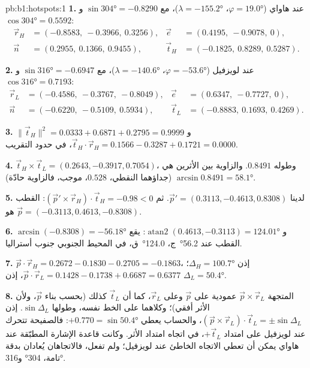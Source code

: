 \begin{solution}{pb:b1:hotspots:1}
\textbf{1.} عند هاواي ($\varphi = \ang{19.0}$، $\lambda = \ang{-155.2}$)، مع $\sin\ang{304} = -0.8290$ و$\cos\ang{304} = 0.5592$:
\[
\begin{aligned}
  \vec r_H &= (-0.8583,\ -0.3966,\ 0.3256), &
  \vec e &= (0.4195,\ -0.9078,\ 0),\\
  \vec n &= (0.2955,\ 0.1366,\ 0.9455), &
  \vec t_H &= (-0.1825,\ 0.8289,\ 0.5287).
\end{aligned}
\]

\textbf{2.} عند لويزفيل ($\varphi = \ang{-53.6}$، $\lambda = \ang{-140.6}$)، مع $\sin\ang{316} = -0.6947$ و$\cos\ang{316} = 0.7193$:
\[
\begin{aligned}
  \vec r_L &= (-0.4586,\ -0.3767,\ -0.8049), &
  \vec e &= (0.6347,\ -0.7727,\ 0),\\
  \vec n &= (-0.6220,\ -0.5109,\ 0.5934), &
  \vec t_L &= (-0.8883,\ 0.1693,\ 0.4269).
\end{aligned}
\]

\textbf{3.} $\lVert\vec t_H\rVert^2 = 0.0333 + 0.6871 + 0.2795 = 0.9999$ و
$\vec t_H\cdot\vec r_H = 0.1566 - 0.3287 + 0.1721 = 0.0000$، في حدود التقريب.

\textbf{4.} $\vec t_H\times\vec t_L = (0.2643, -0.3917, 0.7054)$، وطوله
$0.8491$. والزاوية بين الأثرين هي $\arcsin0.8491 = \ang{58.1}$ (جداؤهما النقطي، $0.528$، موجب، فالزاوية حادّة).

\textbf{5.} لدينا $\vec p' = (0.3113, -0.4613, 0.8308)$. ثم
$(\vec p'\times\vec r_H)\cdot\vec t_H = -0.98 < 0$: القطب هو
$\vec p = (-0.3113, 0.4613, -0.8308)$.

\textbf{6.} $\arcsin(-0.8308) = \ang{-56.18}$ و
$\operatorname{atan2}(0.4613, -0.3113) = \ang{124.01}$: يقع القطب عند \ang{56.2}~ج، \ang{124.0}~ق، في المحيط الجنوبي جنوب أستراليا.

\textbf{7.} $\vec p\cdot\vec r_H = 0.2672 - 0.1830 - 0.2705 = -0.1863$، إذن
$\Delta_H = \ang{100.7}$؛ $\vec p\cdot\vec r_L = 0.1428 - 0.1738 + 0.6687 =
0.6377$، إذن $\Delta_L = \ang{50.4}$.

\textbf{8.} المتجهة $\vec p\times\vec r_L$ عمودية على $\vec p$ وعلى $\vec r_L$، كما أن $\vec t_L$ كذلك (بحسب بناء $\vec p$، ولأن الأثر أفقي)؛ وكلاهما على الخط نفسه، وطولها $\sin\Delta_L$. إذن $(\vec p\times\vec r_L)\cdot\vec t_L = \pm\sin\Delta_L$، والحساب يعطي $+0.770 = \sin\ang{50.4}$: فالصفيحة تتحرك عند لويزفيل على امتداد $+\vec t_L$، في اتجاه امتداد الأثر. وكانت قاعدة الإشارة المطبّقة عند هاواي يمكن أن تعطي الاتجاه الخاطئ عند لويزفيل؛ ولم تفعل، فالاتجاهان يُعادان بدقة تامة، \ang{304} و\ang{316}.


\end{solution}
